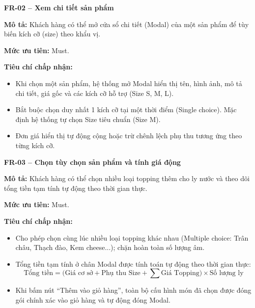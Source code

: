 \documentclass[a4paper]{article}
\begin{document}
\noindent\textbf{FR-02 – Xem chi tiết sản phẩm}\par\nopagebreak
\begin{list}{}{%
    \setlength{\leftmargin}{0.8cm}%
    \setlength{\rightmargin}{0pt}%
    \setlength{\labelwidth}{0pt}%
    \setlength{\labelsep}{0pt}%
    \setlength{\itemindent}{0pt}%
    \setlength{\listparindent}{0pt}%
    \setlength{\itemsep}{5pt}%
    \setlength{\parsep}{0pt}%
    \setlength{\topsep}{5pt}%
}
\item[] \textbf{Mô tả:} Khách hàng có thể mở cửa sổ chi tiết (Modal) của một sản phẩm để tùy biến kích cỡ (size) theo khẩu vị.
\item[] \textbf{Mức ưu tiên:} Must.
\item[] \textbf{Tiêu chí chấp nhận:}
\begin{itemize}
    \item Khi chọn một sản phẩm, hệ thống mở Modal hiển thị tên, hình ảnh, mô tả chi tiết, giá gốc và các kích cỡ hỗ trợ (Size S, M, L).
    \item Bắt buộc chọn duy nhất 1 kích cỡ tại một thời điểm (Single choice). Mặc định hệ thống tự chọn Size tiêu chuẩn (Size M).
    \item Đơn giá hiển thị tự động cộng hoặc trừ chênh lệch phụ thu tương ứng theo từng kích cỡ.
\end{itemize}
\end{list}

\par\ifdim\dimexpr\pagegoal-\pagetotal\relax<6\baselineskip\newpage\fi
{}

\noindent\textbf{FR-03 – Chọn tùy chọn sản phẩm và tính giá động}\par\nopagebreak
\begin{list}{}{%
    \setlength{\leftmargin}{0.8cm}%
    \setlength{\rightmargin}{0pt}%
    \setlength{\labelwidth}{0pt}%
    \setlength{\labelsep}{0pt}%
    \setlength{\itemindent}{0pt}%
    \setlength{\listparindent}{0pt}%
    \setlength{\itemsep}{5pt}%
    \setlength{\parsep}{0pt}%
    \setlength{\topsep}{5pt}%
}
\item[] \textbf{Mô tả:} Khách hàng có thể chọn nhiều loại topping thêm cho ly nước và theo dõi tổng tiền tạm tính tự động theo thời gian thực.
\item[] \textbf{Mức ưu tiên:} Must.
\item[] \textbf{Tiêu chí chấp nhận:}
\begin{itemize}
    \item Cho phép chọn cùng lúc nhiều loại topping khác nhau (Multiple choice: Trân châu, Thạch đào, Kem cheese...); chặn hoàn toàn số lượng âm.
    \item Tổng tiền tạm tính ở chân Modal được tính toán tự động theo thời gian thực:
    \[
    \text{Tổng tiền} = \Big(\text{Giá cơ sở} + \text{Phụ thu Size} + \sum \text{Giá Topping}\Big) \times \text{Số lượng ly}
    \]
    \item Khi bấm nút ``Thêm vào giỏ hàng'', toàn bộ cấu hình món đã chọn được đóng gói chính xác vào giỏ hàng và tự động đóng Modal.
\end{itemize}
\end{list}
\end{document}
